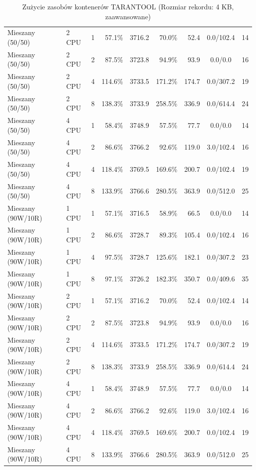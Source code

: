 \begin{table}[ht]
{\begin{tabular}{llcrrrrcc}
Mieszany (50/50) & 2 CPU & 1 & 57.1\% & 3716.2 & 70.0\% & 52.4 & 0.0/102.4 & 14 \\
Mieszany (50/50) & 2 CPU & 2 & 87.5\% & 3723.8 & 94.9\% & 93.9 & 0.0/0.0 & 16 \\
Mieszany (50/50) & 2 CPU & 4 & 114.6\% & 3733.5 & 171.2\% & 174.7 & 0.0/307.2 & 19 \\
Mieszany (50/50) & 2 CPU & 8 & 138.3\% & 3733.9 & 258.5\% & 336.9 & 0.0/614.4 & 24 \\
Mieszany (50/50) & 4 CPU & 1 & 58.4\% & 3748.9 & 57.5\% & 77.7 & 0.0/0.0 & 14 \\
Mieszany (50/50) & 4 CPU & 2 & 86.6\% & 3766.2 & 92.6\% & 119.0 & 3.0/102.4 & 16 \\
Mieszany (50/50) & 4 CPU & 4 & 118.4\% & 3769.5 & 169.6\% & 200.7 & 0.0/102.4 & 19 \\
Mieszany (50/50) & 4 CPU & 8 & 133.9\% & 3766.6 & 280.5\% & 363.9 & 0.0/512.0 & 25 \\
Mieszany (90W/10R) & 1 CPU & 1 & 57.1\% & 3716.5 & 58.9\% & 66.5 & 0.0/0.0 & 14 \\
Mieszany (90W/10R) & 1 CPU & 2 & 86.6\% & 3728.7 & 89.3\% & 105.4 & 0.0/102.4 & 16 \\
Mieszany (90W/10R) & 1 CPU & 4 & 97.5\% & 3728.7 & 125.6\% & 182.1 & 0.0/307.2 & 23 \\
Mieszany (90W/10R) & 1 CPU & 8 & 97.1\% & 3726.2 & 182.3\% & 350.7 & 0.0/409.6 & 35 \\
Mieszany (90W/10R) & 2 CPU & 1 & 57.1\% & 3716.2 & 70.0\% & 52.4 & 0.0/102.4 & 14 \\
Mieszany (90W/10R) & 2 CPU & 2 & 87.5\% & 3723.8 & 94.9\% & 93.9 & 0.0/0.0 & 16 \\
Mieszany (90W/10R) & 2 CPU & 4 & 114.6\% & 3733.5 & 171.2\% & 174.7 & 0.0/307.2 & 19 \\
Mieszany (90W/10R) & 2 CPU & 8 & 138.3\% & 3733.9 & 258.5\% & 336.9 & 0.0/614.4 & 24 \\
Mieszany (90W/10R) & 4 CPU & 1 & 58.4\% & 3748.9 & 57.5\% & 77.7 & 0.0/0.0 & 14 \\
Mieszany (90W/10R) & 4 CPU & 2 & 86.6\% & 3766.2 & 92.6\% & 119.0 & 3.0/102.4 & 16 \\
Mieszany (90W/10R) & 4 CPU & 4 & 118.4\% & 3769.5 & 169.6\% & 200.7 & 0.0/102.4 & 19 \\
Mieszany (90W/10R) & 4 CPU & 8 & 133.9\% & 3766.6 & 280.5\% & 363.9 & 0.0/512.0 & 25 \\
\bottomrule
\end{tabular}%
}
\caption{Zużycie zasobów kontenerów TARANTOOL (Rozmiar rekordu: 4 KB, zaawansowane)}
\label{tab:resources_tarantool_medium_0}
\end{table}
